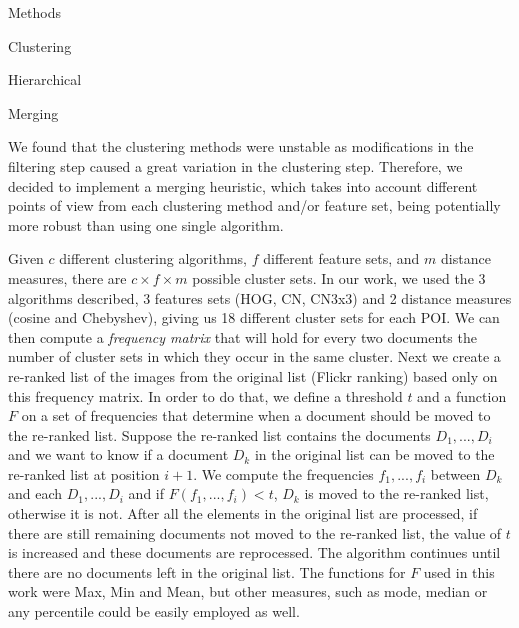 \documentclass{acm_proc_article-me}
\begin{document}
\begin{section}{Methods}
\begin{subsection}{Clustering}
\begin{subsubsection}{Hierarchical}
\end{subsubsection}

\begin{subsubsection}{Merging}

We found that the clustering methods were unstable as modifications in the filtering step caused a great variation in the clustering step.
Therefore, we decided to implement a merging heuristic, which takes into account different points of view from each clustering method and/or feature set,
being potentially more robust than using one single algorithm.



Given $c$ different clustering algorithms, $f$ different feature sets, and $m$ distance measures, there are $c \times f \times m$ possible cluster sets. 
In our work, we used the 3 algorithms described, 3 features sets (HOG, CN, CN3x3) and 2 distance measures (cosine and Chebyshev), giving us 18 different cluster sets for each POI.
We can then compute a \emph{frequency matrix} that will hold for every two documents the number of cluster sets in which they occur in the same cluster.
Next we create a re-ranked list of the images from the original list (Flickr ranking) based only on this frequency matrix.
In order to do that, we define a threshold $t$ and a function $F$ on a set of frequencies that determine when a document should be moved to the re-ranked list.
Suppose the re-ranked list contains the documents $D_1, ..., D_i$ and we want to know if a document $D_k$ in the original list can be moved to the re-ranked list at position $i+1$. We compute the frequencies $f_1, ..., f_i$ between $D_k$ and each $D_1,...,D_i$ and if $F(f_1, ..., f_i) < t$, $D_k$ is moved to the re-ranked list, otherwise it is not. 
After all the elements in the original list are processed, if there are still remaining documents not moved to the re-ranked list, the value of $t$ is increased and these documents are reprocessed. The algorithm continues until there are no documents left in the original list.
The functions for $F$ used in this work were Max, Min and Mean, but other measures, such as mode, median or any percentile could be easily employed as well.


\end{subsubsection}
\end{subsection}
\end{section}
\end{document}
